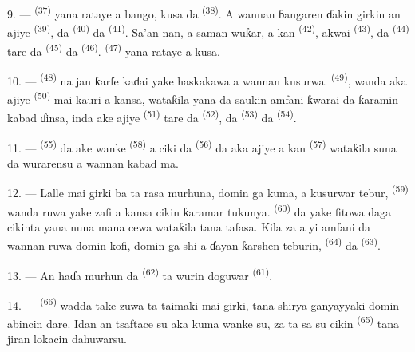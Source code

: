 9. ---  \textsuperscript{(37)} yana rataye a
bango, kusa da  \textsuperscript{(38)}. A wannan
ɓangaren ɗakin girkin an ajiye  \textsuperscript{(39)}, da
 \textsuperscript{(40)} da  \textsuperscript{(41)}. Sa’an nan, a saman wuƙar, a kan
 \textsuperscript{(42)}, akwai 
\textsuperscript{(43)}, da 
\textsuperscript{(44)} tare da  \textsuperscript{(45)}
da  \textsuperscript{(46)}. 
\textsuperscript{(47)} yana rataye a kusa.

10. ---  \textsuperscript{(48)} na jan ƙarfe kaɗai yake
haskakawa a wannan kusurwa. 
\textsuperscript{(49)}, wanda aka ajiye 
\textsuperscript{(50)} mai kauri a kansa, wataƙila yana da saukin
amfani ƙwarai da ƙaramin kabad ɗinsa, inda ake ajiye  \textsuperscript{(51)} tare da 
\textsuperscript{(52)}, da  \textsuperscript{(53)}
da  \textsuperscript{(54)}.

\VUsaut{4.0mm}
\VUsaut{3.0mm}

11. ---  \textsuperscript{(55)} da ake wanke
 \textsuperscript{(58)} a ciki da  \textsuperscript{(56)} da aka ajiye a kan 
\textsuperscript{(57)} wataƙila suna da wurarensu a wannan kabad ma.

12. --- Lalle mai girki ba ta rasa murhuna, domin ga kuma, a kusurwar
tebur,  \textsuperscript{(59)} wanda ruwa yake
zafi a kansa cikin ƙaramar tukunya. 
\textsuperscript{(60)} da yake fitowa daga cikinta yana nuna mana cewa
wataƙila tana tafasa. Kila za a yi amfani da wannan ruwa domin kofi,
domin ga shi a ɗayan ƙarshen teburin, 
\textsuperscript{(64)} da  \textsuperscript{(63)}.

13. --- An haɗa murhun da 
\textsuperscript{(62)} ta wurin doguwar 
\textsuperscript{(61)}.

14. ---  \textsuperscript{(66)} wadda take zuwa
ta taimaki mai girki, tana shirya ganyayyaki domin abincin dare. Idan
an tsaftace su aka kuma wanke su, za ta sa su cikin 
\textsuperscript{(65)} tana jiran lokacin dahuwarsu.

